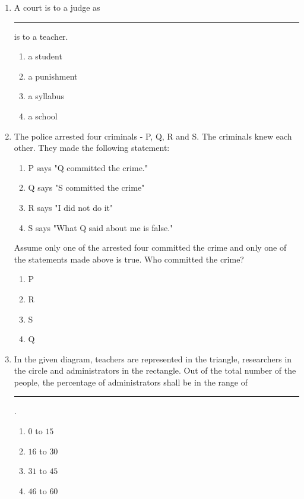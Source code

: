 \documentclass[journal,12pt,onecolumn]{IEEEtran}
\theoremstyle{remark}
\begin{document}
\begin{enumerate}
    \item A court is to a judge as \rule{1.5cm}{0.1mm} is to a teacher.
\begin{multicols}{4}
    \begin{enumerate}
        \item a student
        \item a punishment
        \item a syllabus
        \item a school
    \end{enumerate}
\end{multicols}

    \item The police arrested four criminals - P, Q, R and S. The criminals knew each other. They made the following statement:
\begin{enumerate}[label = ]
\item P says "Q committed the crime."

\item Q says "S committed the crime"

\item R says "I did not do it"

\item S says "What Q said about me is false."
\end{enumerate}

Assume only one of the arrested four committed the crime and only one of the statements made above is true. Who committed the crime?

\begin{multicols}{4}
    \begin{enumerate}
        \item P
        \item R
        \item S
        \item Q
    \end{enumerate}
\end{multicols}

    \item In the given diagram, teachers are represented in the triangle, researchers in the circle and administrators in the rectangle. Out of the total number of the people, the percentage of administrators shall be in the range of \rule{1cm}{0.1mm} .
    

\begin{multicols}{4}
    \begin{enumerate}
        \item $0$ to $15$
        \item $16$ to $30$
        \item $31$ to $45$
        \item $46$ to $60$
    \end{enumerate}
\end{multicols}


\end{enumerate}
\end{document}
